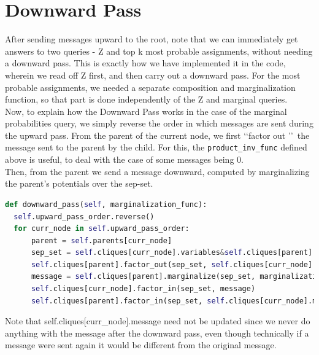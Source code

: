 \documentclass{article}
\begin{document}
\section{Downward Pass}
After sending messages upward to the root, note that we can immediately get answers to two queries - Z and top k most probable assignments, without needing a downward pass. This is exactly how we have implemented it in the code, wherein we read off Z first, and then carry out a downward pass. For the most probable assignments, we needed a separate composition and marginalization function, so that part is done independently of the Z and marginal queries.\\
Now, to explain how the Downward Pass works in the case of the marginal probabilities query, we simply reverse the order in which messages are sent during the upward pass. From the parent of the current node, we first \lq\lq factor out \rq\rq\ the message sent to the parent by the child. For this, the \texttt{product\_inv\_func} defined above is useful, to deal with the case of some messages being 0.\\
Then, from the parent we send a message downward, computed by marginalizing the parent's potentials over the sep-set.  
\begin{lstlisting}[language=Python]
  def downward_pass(self, marginalization_func):
  self.upward_pass_order.reverse()
  for curr_node in self.upward_pass_order:
      parent = self.parents[curr_node]
      sep_set = self.cliques[curr_node].variables&self.cliques[parent].variables
      self.cliques[parent].factor_out(sep_set, self.cliques[curr_node].message)
      message = self.cliques[parent].marginalize(sep_set, marginalization_func)
      self.cliques[curr_node].factor_in(sep_set, message)
      self.cliques[parent].factor_in(sep_set, self.cliques[curr_node].message)
\end{lstlisting}
Note that self.cliques[curr\_node].message need not be updated since we never do anything with the message after the downward pass, even though technically if a message were sent again it would be different from the original message.
\end{document}
